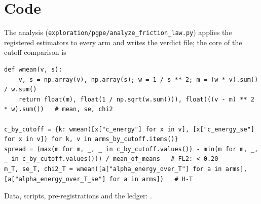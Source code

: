 \documentclass[11pt,a4paper]{article}
\begin{document}
\section{Code}\label{app:code}
The analysis (\texttt{exploration/pgpe/analyze\_friction\_law.py}) applies the registered estimators to every arm and writes the verdict file; the core of the cutoff comparison is
\begin{lstlisting}
def wmean(v, s):
    v, s = np.array(v), np.array(s); w = 1 / s ** 2; m = (w * v).sum() / w.sum()
    return float(m), float(1 / np.sqrt(w.sum())), float(((v - m) ** 2 * w).sum())   # mean, se, chi2

c_by_cutoff = {k: wmean([x["c_energy"] for x in v], [x["c_energy_se"] for x in v]) for k, v in arms_by_cutoff.items()}
spread = (max(m for m, _, _ in c_by_cutoff.values()) - min(m for m, _, _ in c_by_cutoff.values())) / mean_of_means   # FL2: < 0.20
m_T, se_T, chi2_T = wmean([a["alpha_energy_over_T"] for a in arms], [a["alpha_energy_over_T_se"] for a in arms])   # H-T
\end{lstlisting}
Data, scripts, pre-registrations and the ledger: \cite{Callens2026sw}.



\end{document}
